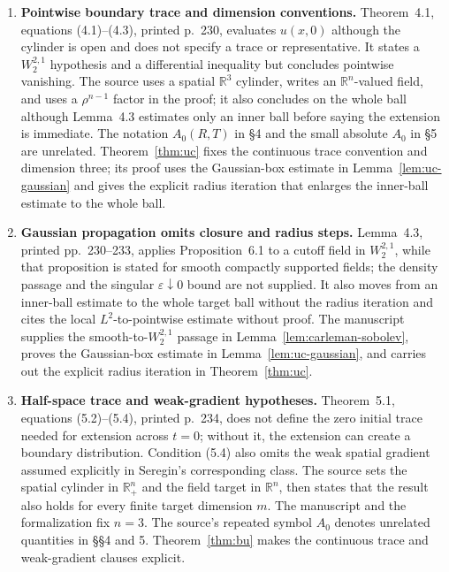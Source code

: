 \documentclass[11pt,letterpaper]{article}
\numberwithin{equation}{section}
\theoremstyle{plain}
\theoremstyle{definition}
\theoremstyle{remark}
\begin{document}
\begin{enumerate}
\item \textbf{Pointwise boundary trace and dimension conventions.} Theorem~4.1, equations (4.1)--(4.3), printed p.~230, evaluates \(u(x,0)\) although the cylinder is open and does not specify a trace or representative. It states a \(W^{2,1}_2\) hypothesis and a differential inequality but concludes pointwise vanishing. The source uses a spatial \(\mathbb R^3\) cylinder, writes an \(\mathbb R^n\)-valued field, and uses a \(\rho^{n-1}\) factor in the proof; it also concludes on the whole ball although Lemma~4.3 estimates only an inner ball before saying the extension is immediate. The notation \(A_0(R,T)\) in §4 and the small absolute \(A_0\) in §5 are unrelated. Theorem~\ref{thm:uc} fixes the continuous trace convention and dimension three; its proof uses the Gaussian-box estimate in Lemma~\ref{lem:uc-gaussian} and gives the explicit radius iteration that enlarges the inner-ball estimate to the whole ball.

\item \textbf{Gaussian propagation omits closure and radius steps.} Lemma~4.3, printed pp.~230--233, applies Proposition~6.1 to a cutoff field in \(W^{2,1}_2\), while that proposition is stated for smooth compactly supported fields; the density passage and the singular \(\varepsilon\downarrow0\) bound are not supplied. It also moves from an inner-ball estimate to the whole target ball without the radius iteration and cites the local \(L^2\)-to-pointwise estimate without proof. The manuscript supplies the smooth-to-\(W^{2,1}_2\) passage in Lemma~\ref{lem:carleman-sobolev}, proves the Gaussian-box estimate in Lemma~\ref{lem:uc-gaussian}, and carries out the explicit radius iteration in Theorem~\ref{thm:uc}.

\item \textbf{Half-space trace and weak-gradient hypotheses.} Theorem~5.1, equations (5.2)--(5.4), printed p.~234, does not define the zero initial trace needed for extension across \(t=0\); without it, the extension can create a boundary distribution. Condition (5.4) also omits the weak spatial gradient assumed explicitly in Seregin's corresponding class. The source sets the spatial cylinder in \(\mathbb R^n_+\) and the field target in \(\mathbb R^n\), then states that the result also holds for every finite target dimension \(m\). The manuscript and the formalization fix \(n=3\). The source's repeated symbol \(A_0\) denotes unrelated quantities in §§4 and 5. Theorem~\ref{thm:bu} makes the continuous trace and weak-gradient clauses explicit.


\end{enumerate}
\end{document}
